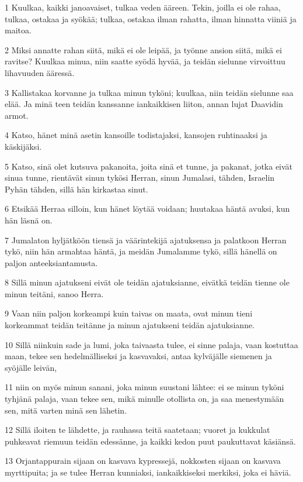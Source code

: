 \par 1 Kuulkaa, kaikki janoavaiset, tulkaa veden ääreen. Tekin, joilla ei ole rahaa, tulkaa, ostakaa ja syökää; tulkaa, ostakaa ilman rahatta, ilman hinnatta viiniä ja maitoa.
\par 2 Miksi annatte rahan siitä, mikä ei ole leipää, ja työnne ansion siitä, mikä ei ravitse? Kuulkaa minua, niin saatte syödä hyvää, ja teidän sielunne virvoittuu lihavuuden ääressä.
\par 3 Kallistakaa korvanne ja tulkaa minun tyköni; kuulkaa, niin teidän sielunne saa elää. Ja minä teen teidän kanssanne iankaikkisen liiton, annan lujat Daavidin armot.
\par 4 Katso, hänet minä asetin kansoille todistajaksi, kansojen ruhtinaaksi ja käskijäksi.
\par 5 Katso, sinä olet kutsuva pakanoita, joita sinä et tunne, ja pakanat, jotka eivät sinua tunne, rientävät sinun tykösi Herran, sinun Jumalasi, tähden, Israelin Pyhän tähden, sillä hän kirkastaa sinut.
\par 6 Etsikää Herraa silloin, kun hänet löytää voidaan; huutakaa häntä avuksi, kun hän läsnä on.
\par 7 Jumalaton hyljätköön tiensä ja väärintekijä ajatuksensa ja palatkoon Herran tykö, niin hän armahtaa häntä, ja meidän Jumalamme tykö, sillä hänellä on paljon anteeksiantamusta.
\par 8 Sillä minun ajatukseni eivät ole teidän ajatuksianne, eivätkä teidän tienne ole minun teitäni, sanoo Herra.
\par 9 Vaan niin paljon korkeampi kuin taivas on maata, ovat minun tieni korkeammat teidän teitänne ja minun ajatukseni teidän ajatuksianne.
\par 10 Sillä niinkuin sade ja lumi, joka taivaasta tulee, ei sinne palaja, vaan kostuttaa maan, tekee sen hedelmälliseksi ja kasvavaksi, antaa kylväjälle siemenen ja syöjälle leivän,
\par 11 niin on myös minun sanani, joka minun suustani lähtee: ei se minun tyköni tyhjänä palaja, vaan tekee sen, mikä minulle otollista on, ja saa menestymään sen, mitä varten minä sen lähetin.
\par 12 Sillä iloiten te lähdette, ja rauhassa teitä saatetaan; vuoret ja kukkulat puhkeavat riemuun teidän edessänne, ja kaikki kedon puut paukuttavat käsiänsä.
\par 13 Orjantappurain sijaan on kasvava kypressejä, nokkosten sijaan on kasvava myrttipuita; ja se tulee Herran kunniaksi, iankaikkiseksi merkiksi, joka ei häviä.

